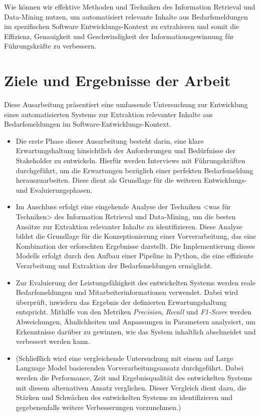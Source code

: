 \documentclass[a4paper,12pt]{scrreprt}
\newcommand{\hiddenchapter}[1]{
	\chapter*{{#1}}
}
\begin{document}
Wie können wir effektive Methoden und Techniken des Information Retrieval und Data-Mining nutzen, um automatisiert relevante Inhalte aus Bedarfsmeldungen im spezifischen Software Entwicklungs-Kontext zu extrahieren und somit die Effizienz, Genauigkeit und Geschwindigkeit der Informationsgewinnung für Führungskräfte zu verbessern.
\hiddenchapter{Ziele und Ergebnisse der Arbeit}
Diese Ausarbeitung präsentiert eine umfassende Untersuchung zur Entwicklung eines automatisierten Systems zur Extraktion relevanter Inhalte aus Bedarfsmeldungen im Software-Entwicklungs-Kontext.
\begin{itemize}
	\item Die erste Phase dieser Ausarbeitung besteht darin, eine klare Erwartungshaltung hinsichtlich der Anforderungen und Bedürfnisse der Stakeholder zu entwickeln. Hierfür werden Interviews mit Führungskräften durchgeführt, um die Erwartungen bezüglich einer \glqq{}perfekten\grqq{} Bedarfsmeldung herauszuarbeiten. Diese dient als Grundlage für die weiteren Entwicklungs- und Evaluierungsphasen.
	\item Im Anschluss erfolgt eine eingehende Analyse der Techniken <was für Techniken> des Information Retrieval und Data-Mining, um die besten Ansätze zur Extraktion relevanter Inhalte zu identifizieren. Diese Analyse bildet die Grundlage für die Konzeptionierung einer Vorverarbeitung, das eine Kombination der erforschten Ergebnisse darstellt. Die Implementierung dieses Modells erfolgt durch den Aufbau einer Pipeline in Python, die eine effiziente Verarbeitung und Extraktion der Bedarfsmeldungen ermöglicht.
	\item Zur Evaluierung der Leistungsfähigkeit des entwickelten Systems werden reale Bedarfsmeldungen und Mitarbeiterinformationen verwendet. Dabei wird überprüft, inwiefern das Ergebnis der definierten Erwartungshaltung entspricht. Mithilfe von den Metriken \emph{Precision}, \emph{Recall} und \emph{F1-Score} werden Abweichungen, Ähnlichkeiten und Anpassungen in Parametern analysiert, um Erkenntnisse darüber zu gewinnen, wie das System inhaltlich abschneidet und verbessert werden kann.
	\item (Schließlich wird eine vergleichende Untersuchung mit einem auf Large Language Model basierenden Vorverarbeitungsansatz durchgeführt. Dabei werden die Performance, Zeit und Ergebnisqualität des entwickelten Systems mit diesem alternativen Ansatz verglichen. Dieser Vergleich dient dazu, die Stärken und Schwächen des entwickelten Systems zu identifizieren und gegebenenfalls weitere Verbesserungen vorzunehmen.)
\end{itemize}
\end{document}
